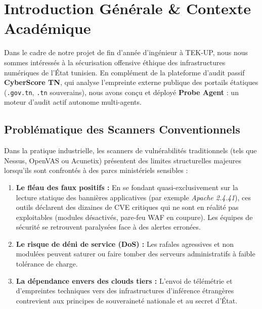 \documentclass[11pt,a4paper,oneside]{article}
\begin{document}
\section{Introduction Générale \& Contexte Académique}

Dans le cadre de notre projet de fin d'année d'ingénieur à TEK-UP, nous nous sommes intéressés à la sécurisation offensive éthique des infrastructures numériques de l'État tunisien. En complément de la plateforme d'audit passif \textbf{CyberScore TN}, qui analyse l'empreinte externe publique des portails étatiques (\texttt{.gov.tn}, \texttt{.tn} souverains), nous avons conçu et déployé \textbf{Probe Agent} : un moteur d'audit actif autonome multi-agents.

\subsection{Problématique des Scanners Conventionnels}
Dans la pratique industrielle, les scanners de vulnérabilités traditionnels (tels que Nessus, OpenVAS ou Acunetix) présentent des limites structurelles majeures lorsqu'ils sont confrontés à des parcs ministériels sensibles :
\begin{enumerate}
    \item \textbf{Le fléau des faux positifs :} En se fondant quasi-exclusivement sur la lecture statique des bannières applicatives (par exemple \textit{Apache 2.4.41}), ces outils déclarent des dizaines de CVE critiques qui ne sont en réalité pas exploitables (modules désactivés, pare-feu WAF en coupure). Les équipes de sécurité se retrouvent paralysées face à des alertes erronées.
    \item \textbf{Le risque de déni de service (DoS) :} Les rafales agressives et non modulées peuvent saturer ou faire tomber des serveurs administratifs à faible tolérance de charge.
    \item \textbf{La dépendance envers des clouds tiers :} L'envoi de télémétrie et d'empreintes techniques vers des infrastructures d'inférence étrangères contrevient aux principes de souveraineté nationale et au secret d'État.
\end{enumerate}
\end{document}
